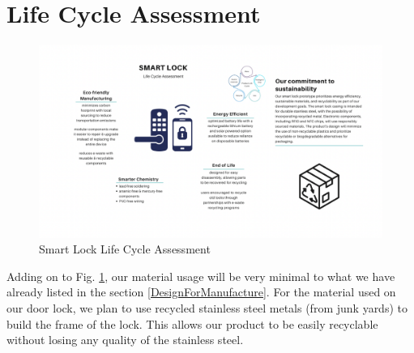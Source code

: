\section{Life Cycle Assessment}


\begin{figure}[htbp]
    \centering
    \includegraphics[width=1 \linewidth]{./img/LifeCycleAssessment.png}
    \caption{Smart Lock Life Cycle Assessment}
    \label{fig:LifeCycleFig}
\end{figure}

Adding on to Fig. \ref{fig:LifeCycleFig}, our material usage will be very minimal to what we have already listed in the section \ref{DesignForManufacture}. For the material used on our door lock, we plan to use recycled stainless steel metals (from junk yards) to build the frame of the lock. This allows our product to be easily recyclable without losing any quality of the stainless steel.
